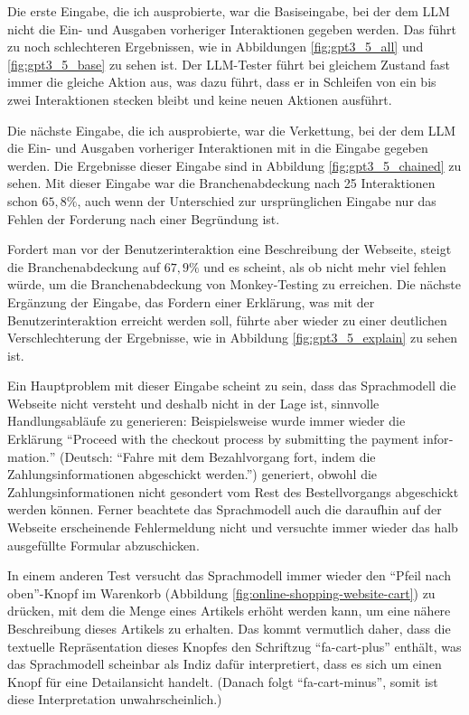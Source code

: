 Die erste Eingabe, die ich ausprobierte, war die Basiseingabe, bei der dem LLM nicht die Ein- und Ausgaben vorheriger Interaktionen gegeben werden.
Das führt zu noch schlechteren Ergebnissen, wie in Abbildungen \ref{fig:gpt3_5_all} und \ref{fig:gpt3_5_base} zu sehen ist.
Der LLM-Tester führt bei gleichem Zustand fast immer die gleiche Aktion aus, was dazu führt, dass er in Schleifen von ein bis zwei Interaktionen stecken bleibt und keine neuen Aktionen ausführt.

Die nächste Eingabe, die ich ausprobierte, war die Verkettung, bei der dem LLM die Ein- und Ausgaben vorheriger Interaktionen mit in die Eingabe gegeben werden.
Die Ergebnisse dieser Eingabe sind in Abbildung \ref{fig:gpt3_5_chained} zu sehen.
Mit dieser Eingabe war die Branchenabdeckung nach 25 Interaktionen schon $65{,}8\%$, auch wenn der Unterschied zur ursprünglichen Eingabe nur das Fehlen der Forderung nach einer Begründung ist.

Fordert man vor der Benutzerinteraktion eine Beschreibung der Webseite, steigt die Branchenabdeckung auf $67{,}9\%$ und es scheint, als ob nicht mehr viel fehlen würde, um die Branchenabdeckung von Monkey-Testing zu erreichen.
Die nächste Ergänzung der Eingabe, das Fordern einer Erklärung, was mit der Benutzerinteraktion erreicht werden soll, führte aber wieder zu einer deutlichen Verschlechterung der Ergebnisse, wie in Abbildung \ref{fig:gpt3_5_explain} zu sehen ist.

Ein Hauptproblem mit dieser Eingabe scheint zu sein, dass das Sprachmodell die Webseite nicht versteht und deshalb nicht in der Lage ist, sinnvolle Handlungsabläufe zu generieren:
Beispielsweise wurde immer wieder die Erklärung \enquote{\foreignlanguage{english}{Proceed with the checkout process by submitting the payment information.}} (Deutsch: \enquote{Fahre mit dem Bezahlvorgang fort, indem die Zahlungsinformationen abgeschickt werden.}) generiert, obwohl die Zahlungsinformationen nicht gesondert vom Rest des Bestellvorgangs abgeschickt werden können.
Ferner beachtete das Sprachmodell auch die daraufhin auf der Webseite erscheinende Fehlermeldung nicht und versuchte immer wieder das halb ausgefüllte Formular abzuschicken.

In einem anderen Test versucht das Sprachmodell immer wieder den \enquote{Pfeil nach oben}-Knopf im Warenkorb (Abbildung \ref{fig:online-shopping-website-cart}) zu drücken, mit dem die Menge eines Artikels erhöht werden kann, um eine nähere Beschreibung dieses Artikels zu erhalten.
Das kommt vermutlich daher, dass die textuelle Repräsentation dieses Knopfes den Schriftzug \enquote{fa-cart-plus} enthält, was das Sprachmodell scheinbar als Indiz dafür interpretiert, dass es sich um einen Knopf für eine Detailansicht handelt.
(Danach folgt \enquote{fa-cart-minus}, somit ist diese Interpretation unwahrscheinlich.)

